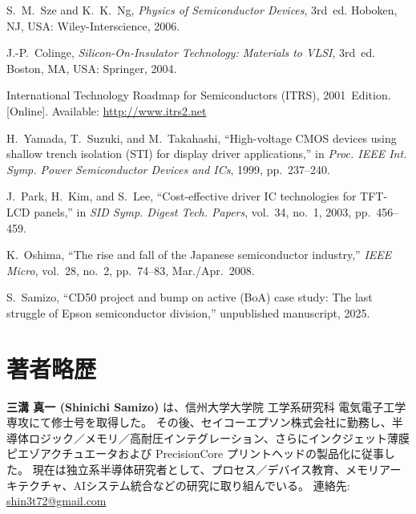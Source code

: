 \documentclass[conference]{IEEEtran}
\begin{document}
\begin{thebibliography}{99}

S.~M.~Sze and K.~K.~Ng, \textit{Physics of Semiconductor Devices}, 3rd~ed. Hoboken, NJ, USA: Wiley-Interscience, 2006.

J.-P.~Colinge, \textit{Silicon-On-Insulator Technology: Materials to VLSI}, 3rd~ed. Boston, MA, USA: Springer, 2004.

International Technology Roadmap for Semiconductors (ITRS), 2001~Edition. [Online]. Available: \url{http://www.itrs2.net}

H.~Yamada, T.~Suzuki, and M.~Takahashi, ``High-voltage CMOS devices using shallow trench isolation (STI) for display driver applications,'' in \textit{Proc. IEEE Int. Symp. Power Semiconductor Devices and ICs}, 1999, pp.~237--240.

J.~Park, H.~Kim, and S.~Lee, ``Cost-effective driver IC technologies for TFT-LCD panels,'' in \textit{SID Symp. Digest Tech. Papers}, vol.~34, no.~1, 2003, pp.~456--459.

K.~Oshima, ``The rise and fall of the Japanese semiconductor industry,'' \textit{IEEE Micro}, vol.~28, no.~2, pp.~74--83, Mar./Apr.~2008.

S.~Samizo, ``CD50 project and bump on active (BoA) case study: The last struggle of Epson semiconductor division,'' unpublished manuscript, 2025.

\end{thebibliography}

\section*{著者略歴}
\textbf{三溝 真一 (Shinichi Samizo)} は、信州大学大学院 工学系研究科 電気電子工学専攻にて修士号を取得した。  
その後、セイコーエプソン株式会社に勤務し、半導体ロジック／メモリ／高耐圧インテグレーション、さらにインクジェット薄膜ピエゾアクチュエータおよび PrecisionCore プリントヘッドの製品化に従事した。  
現在は独立系半導体研究者として、プロセス／デバイス教育、メモリアーキテクチャ、AIシステム統合などの研究に取り組んでいる。  
連絡先: \href{mailto:shin3t72@gmail.com}{shin3t72@gmail.com}
\end{document}
